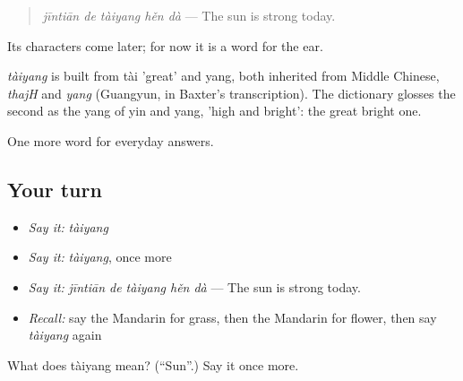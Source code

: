 \begin{quote}
\emph{jīntiān de tàiyang hěn dà} — The sun is strong today.
\end{quote}

Its characters come later; for now it is a word for the ear.

\begin{cousinweb}
\emph{tàiyang} is built from tài 'great' and yang, both inherited from Middle Chinese, \emph{thajH} and \emph{yang} (Guangyun, in Baxter's transcription). The dictionary glosses the second as the yang of yin and yang, 'high and bright': the great bright one.
\end{cousinweb}

\begin{grammarlens}[title={What you've built}]
One more word for everyday answers.
\end{grammarlens}

\subsection*{Your turn}
\begin{itemize}
\raggedright
  \item \emph{Say it:} \emph{tàiyang}
  \item \emph{Say it:} \emph{tàiyang}, once more
  \item \emph{Say it:} \emph{jīntiān de tàiyang hěn dà} — The sun is strong today.
  \item \emph{Recall:} say the Mandarin for grass, then the Mandarin for flower, then say \emph{tàiyang} again
\end{itemize}

\begin{tcolorbox}[breakable,colback=teal!4,colframe=teal!35!black,title={Before you move on}]
What does tàiyang mean? (\textquotedblleft{}Sun\textquotedblright{}.) Say it once more.
\end{tcolorbox}
